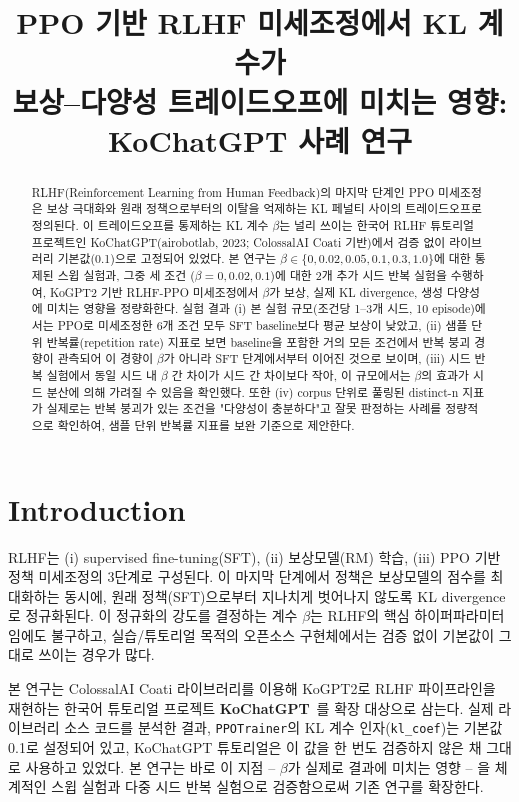 \documentclass[conference]{IEEEtran}
\title{PPO 기반 RLHF 미세조정에서 KL 계수가\\보상--다양성 트레이드오프에 미치는 영향:\\KoChatGPT 사례 연구}
\author{
  \IEEEauthorblockN{Yongseok Oh}
  \IEEEauthorblockA{ysoh1113@gmail.com}
}
\begin{document}
\maketitle

\begin{abstract}
RLHF(Reinforcement Learning from Human Feedback)의 마지막 단계인 PPO 미세조정은
보상 극대화와 원래 정책으로부터의 이탈을 억제하는 KL 페널티 사이의 트레이드오프로
정의된다. 이 트레이드오프를 통제하는 KL 계수 $\beta$는 널리 쓰이는 한국어 RLHF
튜토리얼 프로젝트인 KoChatGPT(airobotlab, 2023; ColossalAI Coati 기반)에서
검증 없이 라이브러리 기본값(0.1)으로 고정되어 있었다. 본 연구는 $\beta \in
\{0, 0.02, 0.05, 0.1, 0.3, 1.0\}$에 대한 통제된 스윕 실험과, 그중 세 조건
($\beta{=}0, 0.02, 0.1$)에 대한 2개 추가 시드 반복 실험을 수행하여, KoGPT2
기반 RLHF-PPO 미세조정에서 $\beta$가 보상, 실제 KL divergence, 생성
다양성에 미치는 영향을 정량화한다. 실험 결과 (i) 본 실험 규모(조건당
1--3개 시드, 10 episode)에서는 PPO로 미세조정한 6개 조건 모두 SFT baseline보다
평균 보상이 낮았고, (ii) 샘플 단위 반복률(repetition rate) 지표로 보면
baseline을 포함한 거의 모든 조건에서 반복 붕괴 경향이 관측되어 이 경향이
$\beta$가 아니라 SFT 단계에서부터 이어진 것으로 보이며, (iii) 시드 반복
실험에서 동일 시드 내 $\beta$ 간 차이가 시드 간 차이보다 작아, 이 규모에서는
$\beta$의 효과가 시드 분산에 의해 가려질 수 있음을 확인했다. 또한 (iv)
corpus 단위로 풀링된 distinct-n 지표가 실제로는 반복 붕괴가 있는 조건을
"다양성이 충분하다"고 잘못 판정하는 사례를 정량적으로 확인하여, 샘플 단위
반복률 지표를 보완 기준으로 제안한다.
\end{abstract}

\section{Introduction}

RLHF는 (i) supervised fine-tuning(SFT), (ii) 보상모델(RM) 학습, (iii) PPO 기반
정책 미세조정의 3단계로 구성된다. 이 마지막 단계에서 정책은 보상모델의 점수를
최대화하는 동시에, 원래 정책(SFT)으로부터 지나치게 벗어나지 않도록 KL
divergence로 정규화된다. 이 정규화의 강도를 결정하는 계수 $\beta$는 RLHF의
핵심 하이퍼파라미터임에도 불구하고, 실습/튜토리얼 목적의 오픈소스 구현체에서는
검증 없이 기본값이 그대로 쓰이는 경우가 많다.

본 연구는 ColossalAI Coati 라이브러리를 이용해 KoGPT2로 RLHF 파이프라인을
재현하는 한국어 튜토리얼 프로젝트 \textbf{KoChatGPT}~\cite{kochatgpt2023,
colossalchat2023}를 확장 대상으로 삼는다. 실제 라이브러리 소스 코드를 분석한
결과, \texttt{PPOTrainer}의 KL 계수 인자(\texttt{kl\_coef})는 기본값 0.1로
설정되어 있고, KoChatGPT 튜토리얼은 이 값을 한 번도 검증하지 않은 채 그대로
사용하고 있었다. 본 연구는 바로 이 지점 -- $\beta$가 실제로 결과에 미치는
영향 -- 을 체계적인 스윕 실험과 다중 시드 반복 실험으로 검증함으로써 기존
연구를 확장한다.
\end{document}
